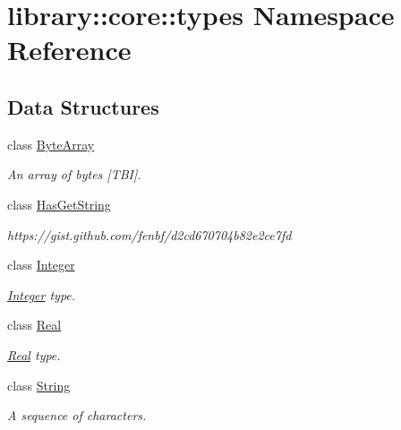 \hypertarget{namespacelibrary_1_1core_1_1types}{}\section{library\+:\+:core\+:\+:types Namespace Reference}
\label{namespacelibrary_1_1core_1_1types}
\subsection*{Data Structures}
\begin{DoxyCompactItemize}
\item 
class \hyperlink{classlibrary_1_1core_1_1types_1_1ByteArray}{Byte\+Array}
\begin{DoxyCompactList}\small\item\em An array of bytes \mbox{[}T\+BI\mbox{]}. \end{DoxyCompactList}\item 
class \hyperlink{classlibrary_1_1core_1_1types_1_1HasGetString}{Has\+Get\+String}
\begin{DoxyCompactList}\small\item\em https\+://gist.github.\+com/fenbf/d2cd670704b82e2ce7fd \end{DoxyCompactList}\item 
class \hyperlink{classlibrary_1_1core_1_1types_1_1Integer}{Integer}
\begin{DoxyCompactList}\small\item\em \hyperlink{classlibrary_1_1core_1_1types_1_1Integer}{Integer} type. \end{DoxyCompactList}\item 
class \hyperlink{classlibrary_1_1core_1_1types_1_1Real}{Real}
\begin{DoxyCompactList}\small\item\em \hyperlink{classlibrary_1_1core_1_1types_1_1Real}{Real} type. \end{DoxyCompactList}\item 
class \hyperlink{classlibrary_1_1core_1_1types_1_1String}{String}
\begin{DoxyCompactList}\small\item\em A sequence of characters. \end{DoxyCompactList}\end{DoxyCompactItemize}
